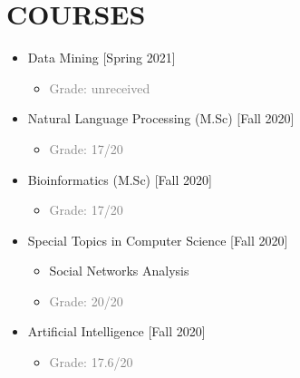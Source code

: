 \documentclass[10pt,a4paper,sans]{moderncv} %
\begin{document}
	\section{COURSES}
	\begin{multicols}{2}
		\begin{itemize}
			\item {} Data Mining \hfill[Spring 2021]
			\begin{itemize}
			    \item \textcolor{gray}{Grade: unreceived}
			\end{itemize}
			\vspace{0.25em}
			
			\item {} Natural Language Processing (M.Sc) \hfill[Fall 2020]
			\begin{itemize}
			    \item \textcolor{gray}{Grade: 17/20}
			\end{itemize}
			\vspace{0.25em}

			\item {} Bioinformatics (M.Sc) \hfill[Fall 2020]
			\begin{itemize}
    			\item \textcolor{gray}{Grade: 17/20}
			\end{itemize}
			\vspace{0.25em}
			\item {} Special Topics in Computer Science \hfill[Fall 2020]
			
			\begin{itemize}
			    \item Social Networks Analysis
			    \item \textcolor{gray}{Grade: 20/20}
			\end{itemize}
			\vspace{0.25em}
			
			\item {} Artificial Intelligence \hfill[Fall 2020]
			\begin{itemize}
    			\item \textcolor{gray}{Grade: 17.6/20}
			\end{itemize}
			\vspace{0.25em}
			

\end{itemize}
\end{multicols}
\end{document}
